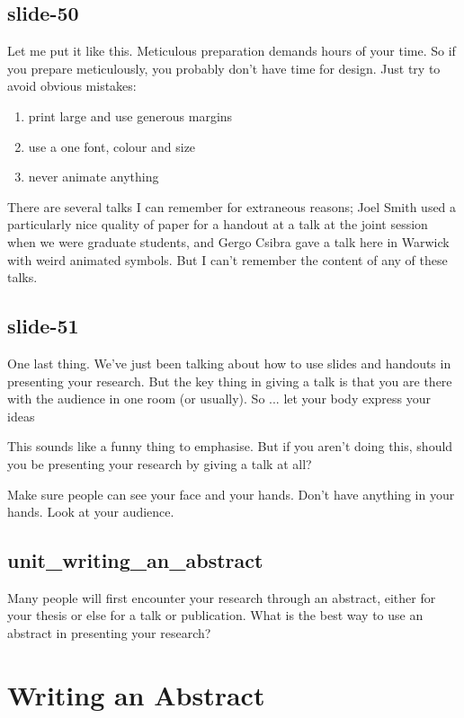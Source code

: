 \documentclass[12pt,\papersize]{extarticle}
\begin{document}
\subsection{slide-50}
Let me put it like this.
Meticulous preparation demands hours of your time.
So if you prepare meticulously, you probably don't have time for design.
Just try to avoid obvious mistakes:
\begin{enumerate}
\item print large and use generous margins
\item use a one font, colour and size 
\item never animate anything
\end{enumerate}
 
There are several talks I can remember for extraneous reasons; Joel Smith used a particularly nice
quality of paper for a handout at a talk at the joint session when we were graduate students,
and Gergo Csibra gave a talk here in Warwick with weird animated symbols.
But I can't remember the content of any of these talks.
 
\subsection{slide-51}
One last thing.
We've just been talking about how to use slides and handouts in presenting your research.
But the key thing in giving a talk is that you are there with the audience in one room
(or usually).  So ...
let your body express your ideas
 
This sounds like a funny thing to emphasise.  
But if you aren't doing this, should you be presenting your research by giving a talk at all?
 
Make sure people can see your face and your hands.
Don't have anything in your hands.
Look at your audience.
 
\subsection{unit\_writing\_an\_abstract}
Many people will first encounter your research through an abstract, either for your thesis or else for a talk or publication.  What is the best way to use an abstract in presenting your research?
 
 
 
\section{Writing an Abstract}
 
\end{document}
